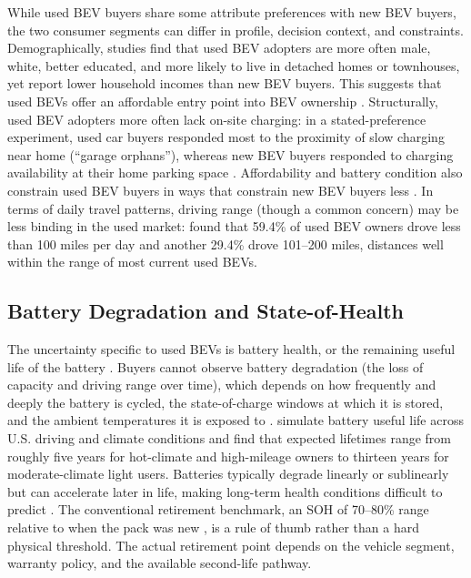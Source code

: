 \documentclass[a4paper,fleqn]{cas-sc}   %
\begin{document}
While used BEV buyers share some attribute preferences with new BEV buyers, the two consumer segments can differ in profile, decision context, and constraints. Demographically, studies find that used BEV adopters are more often male, white, better educated, and more likely to live in detached homes or townhouses, yet report lower household incomes than new BEV buyers. This suggests that used BEVs offer an affordable entry point into BEV ownership \parencite{talFirstLookPlugin2017, sheykhfardAnalyzingPurchaseIntentions2025, mashrurUncoveringFactorsAffecting2025}. Structurally, used BEV adopters more often lack on-site charging: in a stated-preference experiment, used car buyers responded most to the proximity of slow charging near home (``garage orphans''), whereas new BEV buyers responded to charging availability at their home parking space \parencite{zouEffectsChargingInfrastructure2020}. Affordability and battery condition also constrain used BEV buyers in ways that constrain new BEV buyers less \parencite{canepaEarlyLookPlugin2019, lohConcernsExpressedUsed2024}. In terms of daily travel patterns, driving range (though a common concern) may be less binding in the used market: \textcite{sheykhfardAnalyzingPurchaseIntentions2025} found that 59.4\% of used BEV owners drove less than 100 miles per day and another 29.4\% drove 101--200 miles, distances well within the range of most current used BEVs. 



\subsection{Battery Degradation and State-of-Health}

The uncertainty specific to used BEVs is battery health, or the remaining useful life of the battery \parencite{pedrosaSecondhandElectricalVehicles2018}. Buyers cannot observe battery degradation (the loss of capacity and driving range over time), which depends on how frequently and deeply the battery is cycled, the state-of-charge windows at which it is stored, and the ambient temperatures it is exposed to \parencite{bashashPluginHybridElectric2011, neubauerSensitivityBatteryElectric2012}. \textcite{yangPredictiveModelingBattery2018} simulate battery useful life across U.S. driving and climate conditions and find that expected lifetimes range from roughly five years for hot-climate and high-mileage owners to thirteen years for moderate-climate light users. Batteries typically degrade linearly or sublinearly but can accelerate later in life, making long-term health conditions difficult to predict \parencite{attiaReviewKneesLithiumIonBattery2022}. The conventional retirement benchmark, an SOH of 70--80\% range relative to when the pack was new \parencite{canalscasalsEvaluationEndofLifeElectric2019}, is a rule of thumb rather than a hard physical threshold. The actual retirement point depends on the vehicle segment, warranty policy, and the available second-life pathway.
\end{document}
